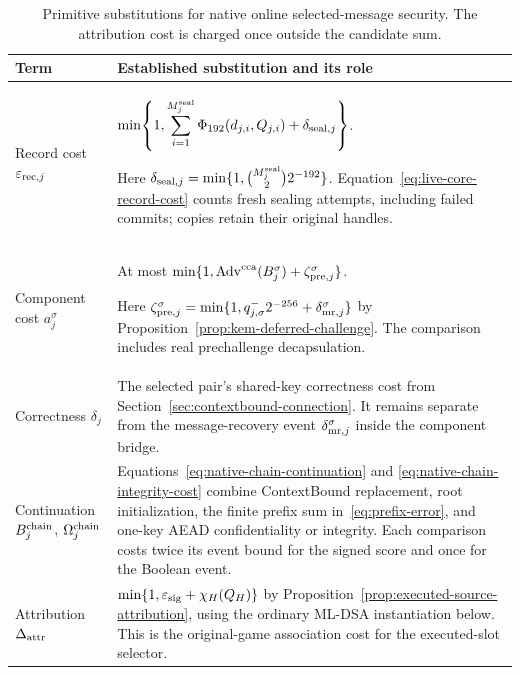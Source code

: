 \begin{table}[htbp]
\caption{Primitive substitutions for native online selected-message security.
The attribution cost is charged once outside the candidate sum.}
\label{tab:native-online-substitutions}
\small
\begin{tabularx}{\textwidth}{@{}L{0.19\textwidth}Y@{}}
\toprule
Term & Established substitution and its role \\
\midrule
Record cost $\varepsilon_{{\rm rec},j}$ &
$\displaystyle\min\!\left\{1,
\sum_{i=1}^{M_j^{\rm seal}}\Phi_{192}(d_{j,i},Q_{j,i})
+\delta_{{\rm seal},j}\right\}$.
\par Here $\delta_{{\rm seal},j}=\min\{1,\binom{M_j^{\rm seal}}2 2^{-192}\}$.
Equation~\eqref{eq:live-core-record-cost} counts fresh sealing attempts,
including failed commits; copies retain their original handles. \\
\addlinespace[3pt]
Component cost $a_j^\sigma$ &
At most $\min\{1,\operatorname{Adv}^{\rm cca}(B_j^\sigma)
+\zeta_{{\rm pre},j}^{\sigma}\}$.
\par Here
$\zeta_{{\rm pre},j}^{\sigma}
=\min\{1,q_{j,\sigma}^{-}2^{-256}+\delta_{{\rm mr},j}^{\sigma}\}$
by Proposition~\ref{prop:kem-deferred-challenge}.
The comparison includes real prechallenge decapsulation. \\
\addlinespace[3pt]
Correctness $\delta_j$ &
The selected pair's shared-key correctness cost from
Section~\ref{sec:contextbound-connection}. It remains separate from the
message-recovery event $\delta_{{\rm mr},j}^{\sigma}$ inside the component
bridge. \\
\addlinespace[3pt]
Continuation $B_j^{\rm chain}$,
$\Omega_j^{\rm chain}$ &
Equations~\eqref{eq:native-chain-continuation} and
\eqref{eq:native-chain-integrity-cost} combine ContextBound replacement,
root initialization, the finite prefix sum in~\eqref{eq:prefix-error},
and one-key AEAD confidentiality or integrity. Each comparison costs twice
its event bound for the signed score and once for the Boolean event. \\
\addlinespace[3pt]
Attribution $\Delta_{\rm attr}$ &
$\min\{1,\varepsilon_{\rm sig}+\chi_H(Q_H)\}$ by
Proposition~\ref{prop:executed-source-attribution}, using the ordinary
ML-DSA instantiation below. This is the original-game association cost
for the executed-slot selector. \\
\bottomrule
\end{tabularx}
\end{table}

